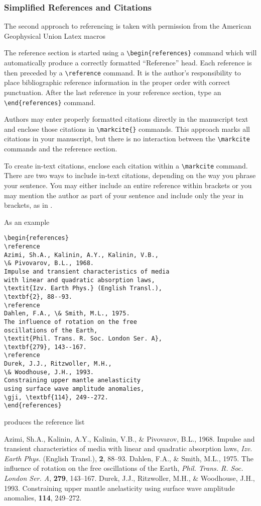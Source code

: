 \documentclass{gji}
\begin{document}
\subsubsection{Simplified References and Citations}

The second approach to referencing is taken with permission from
the American Geophysical Union Latex macros

The reference section is started using a
\verb"\begin{references}" command which will
automatically produce a correctly formatted
``Reference'' head.  Each reference is then
preceded by a \verb"\reference"
command.  It is the author's
responsibility to place bibliographic reference
information in the proper order with correct
punctuation.  After the last reference in your
reference section, type an \verb"\end{references}"
command.

Authors may enter properly formatted citations directly
in the manuscript text and enclose those citations in
\verb"\markcite{}" commands.  This approach
marks all citations in your manuscript, but there
is no interaction between the \verb"\markcite"
commands and the reference section.

To create in-text citations, enclose each citation
within a \verb"\markcite" command.
There are two ways to include in-text citations,
depending on the way you phrase your sentence.
You may either include an entire reference within
brackets  or you
may mention the author as part of your sentence and
include only the year in brackets, as in .

As an example
\begin{verbatim}
\begin{references}
\reference
Azimi, Sh.A., Kalinin, A.Y., Kalinin, V.B.,
\& Pivovarov, B.L., 1968.
Impulse and transient characteristics of media
with linear and quadratic absorption laws,
\textit{Izv. Earth Phys.} (English Transl.),
\textbf{2}, 88--93.
\reference
Dahlen, F.A., \& Smith, M.L., 1975.
The influence of rotation on the free
oscillations of the Earth,
\textit{Phil. Trans. R. Soc. London Ser. A},
\textbf{279}, 143--167.
\reference
Durek, J.J., Ritzwoller, M.H.,
\& Woodhouse, J.H., 1993.
Constraining upper mantle anelasticity
using surface wave amplitude anomalies,
\gji, \textbf{114}, 249--272.
\end{references}
\end{verbatim}
produces the reference list
\begin{references}
Azimi, Sh.A., Kalinin, A.Y., Kalinin, V.B.,
\& Pivovarov, B.L., 1968.
Impulse and transient characteristics of media
with linear and  quadratic absorption laws,
\textit{Izv. Earth Phys.} (English Transl.),
\textbf{2}, 88--93.
Dahlen, F.A., \& Smith, M.L., 1975.
The influence of rotation on the free oscillations of the Earth,
\textit{Phil. Trans. R. Soc. London Ser. A}, \textbf{279}, 143--167.
Durek, J.J., Ritzwoller, M.H., \& Woodhouse, J.H., 1993.
Constraining upper mantle anelasticity
using surface wave amplitude anomalies,
\gji \textbf{114}, 249--272.
\end{references}
\end{document}
